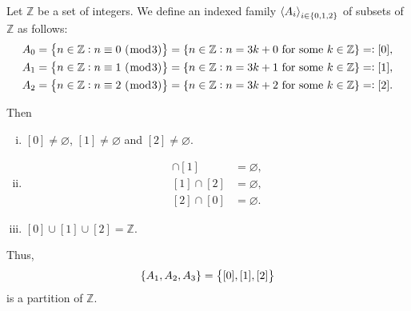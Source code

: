 \documentclass[11pt,openany]{article}
\begin{document}
\begin{example*}
	Let $\mathbb{Z}$ be a set of integers. We define an indexed family $\left\langle A_i \right\rangle_{i\in\set{0,1,2}}$ of subsets of $\mathbb{Z}$ as follows: \begin{align*}
		A_0=\set{n\in\mathbb{Z}: n\equiv 0\ (\bmod 3)}=\set{n\in\mathbb{Z}:n=3k+0\ \text{for some}\ k\in\mathbb{Z}}=:[0],\\
		A_1=\set{n\in\mathbb{Z}: n\equiv 1\ (\bmod 3)}=\set{n\in\mathbb{Z}:n=3k+1\ \text{for some}\ k\in\mathbb{Z}}=:[1],\\
		A_2=\set{n\in\mathbb{Z}: n\equiv 2\ (\bmod 3)}=\set{n\in\mathbb{Z}:n=3k+2\ \text{for some}\ k\in\mathbb{Z}}=:[2].
	\end{align*}
\begin{minipage}{.5\textwidth}
Then \begin{enumerate}[(i)]
	\item $[0]\neq\varnothing$, $[1]\neq\varnothing$ and $[2]\neq\varnothing$.
	\item \begin{align*}
		[0]\cap[1] &= \varnothing, \\
		[1]\cap[2] &= \varnothing, \\
		[2]\cap[0] &= \varnothing.
	\end{align*}
	\item $[0]\cup [1]\cup [2]=\mathbb{Z}$.
\end{enumerate} Thus, \[
\set{A_1,A_2,A_3}=\set{[0],[1],[2]}
\]is a partition of $\mathbb{Z}$.
\end{minipage}
\begin{minipage}{.5\textwidth}
\end{minipage}
\end{example*}
\end{document}
